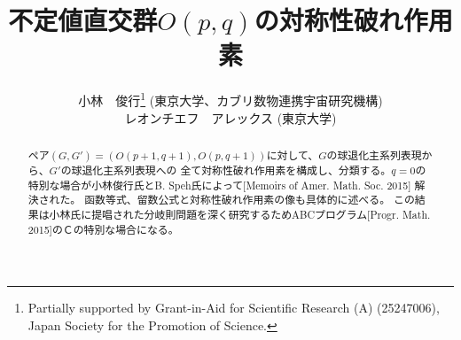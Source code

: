 \documentclass[12pt]{article} %
\theoremstyle{definition}
\theoremstyle{exampstyle} \newtheorem{examp}[theorem]{Theorem}
\begin{document}
\renewcommand{\abstractname}{概要}

\title{不定値直交群$O(p,q)$の対称性破れ作用素}

\author{小林　俊行\thanks{Partially supported by Grant-in-Aid for Scientific
	Research (A) (25247006), Japan Society for the Promotion of Science.} (東京大学、カブリ数物連携宇宙研究機構)\\
  レオンチエフ　アレックス (東京大学)}




  \maketitle
\begin{abstract}
	ペア$(G, G') =(O(p+1, q+1), O(p,q+1))$に対して、$G$の球退化主系列表現から、$G'$の球退化主系列表現への
	全て対称性破れ作用素を構成し、分類する。$q=0$の特別な場合が小林俊行氏とB. Speh氏によって[Memoirs of Amer. Math. Soc. 2015]
	解決された。
	函数等式、留数公式と対称性破れ作用素の像も具体的に述べる。
	この結果は小林氏に提唱された分岐則問題を深く研究するためABCプログラム[Progr. Math. 2015]のＣの特別な場合になる。
\end{abstract}
\end{document}
